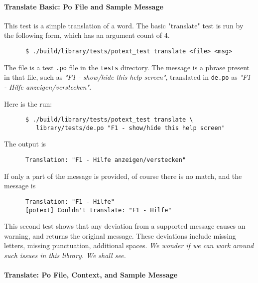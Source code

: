 \paragraph{Translate Basic: Po File and Sample Message}
\label{paragraph:potext_test_translate_po_message}

   This test is a simple translation of a word.
   The basic "translate" test is run by the following form, which has an
   argument count of 4.

   \begin{verbatim}
      $ ./build/library/tests/potext_test translate <file> <msg>
   \end{verbatim}

   The file is a test \texttt{.po} file in the
   \texttt{tests} directory.
   The message is a phrase present in that file, such as
   \textsl{"F1 - show/hide this help screen"}, translated in
   \texttt{de.po} as
   \textsl{"F1 - Hilfe anzeigen/verstecken"}.

   Here is the run:

   \begin{verbatim}
      $ ./build/library/tests/potext_test translate \
         library/tests/de.po "F1 - show/hide this help screen"
   \end{verbatim}

   The output is

   \begin{verbatim}
      Translation: "F1 - Hilfe anzeigen/verstecken"
   \end{verbatim}

   If only a part of the message is provided, of course there is no
   match, and the message is

   \begin{verbatim}
      Translation: "F1 - Hilfe"
      [potext] Couldn't translate: "F1 - Hilfe"
   \end{verbatim}

   This second test shows that any deviation from a supported message causes an
   warning, and returns the original message.
   These deviations include missing letters, missing punctuation,
   additional spaces.
   \textsl{We wonder if we can work around such issues in this library.
   We shall see.}

\paragraph{Translate: Po File, Context, and Sample Message}
\label{paragraph:potext_test_translate_po_context_message}

